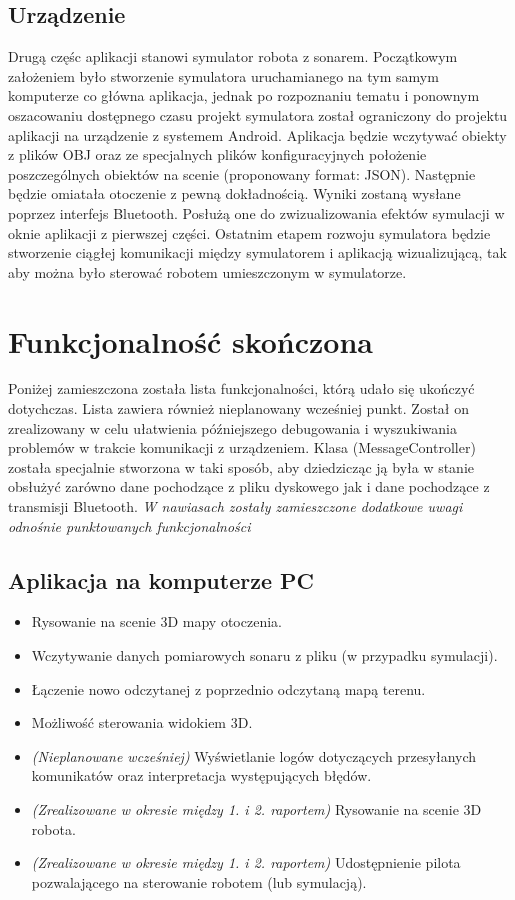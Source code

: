 \documentclass[a4paper,12pt]{article}
\begin{document}
\subsection{Urządzenie} 
Drugą częśc aplikacji stanowi symulator robota z sonarem. Początkowym założeniem było stworzenie symulatora uruchamianego
na tym samym komputerze co główna aplikacja, jednak po rozpoznaniu tematu i ponownym oszacowaniu dostępnego czasu projekt symulatora
został ograniczony do projektu aplikacji na urządzenie z systemem Android.
Aplikacja będzie wczytywać obiekty z plików OBJ oraz ze specjalnych plików konfiguracyjnych
położenie poszczególnych obiektów na scenie (proponowany format: JSON). Następnie będzie
omiatała otoczenie z pewną dokładnością. Wyniki zostaną wysłane poprzez interfejs Bluetooth. Posłużą one
do zwizualizowania efektów symulacji w oknie aplikacji z pierwszej części. 
Ostatnim etapem rozwoju symulatora będzie stworzenie ciągłej komunikacji między symulatorem i aplikacją
wizualizującą, tak aby można było sterować robotem umieszczonym w symulatorze.


\section{Funkcjonalność skończona}
Poniżej zamieszczona została lista funkcjonalności, którą udało się ukończyć dotychczas. Lista zawiera również nieplanowany wcześniej punkt. 
Został on zrealizowany w celu ułatwienia późniejszego debugowania i wyszukiwania problemów w trakcie komunikacji z urządzeniem. Klasa (MessageController)
została specjalnie stworzona w taki sposób, aby dziedzicząc ją była w stanie obsłużyć zarówno dane pochodzące z pliku dyskowego jak i dane pochodzące z 
transmisji Bluetooth. 
\textit{W nawiasach zostały zamieszczone dodatkowe uwagi odnośnie punktowanych funkcjonalności} 
\subsection{Aplikacja na komputerze PC}
\begin{itemize}
\item Rysowanie na scenie 3D mapy otoczenia.
\item Wczytywanie danych pomiarowych sonaru z pliku (w przypadku symulacji).
\item Łączenie nowo odczytanej z poprzednio odczytaną mapą terenu. 
\item Możliwość sterowania widokiem 3D.
\item \textit{ (Nieplanowane wcześniej) }Wyświetlanie logów dotyczących przesyłanych komunikatów oraz interpretacja występujących błędów.
\item \textit{ (Zrealizowane w okresie między 1. i 2. raportem) } Rysowanie na scenie 3D robota.
\item \textit{ (Zrealizowane w okresie między 1. i 2. raportem) } Udostępnienie pilota pozwalającego na sterowanie robotem (lub symulacją).
\end{itemize}
\end{document}

